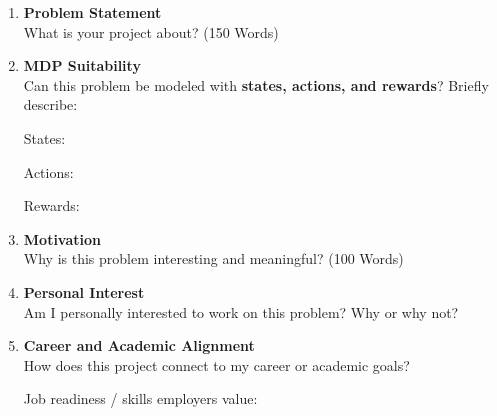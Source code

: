 \documentclass[12pt,a4paper]{article}
\begin{document}
\begin{enumerate}
    \item \textbf{Problem Statement} \\[3pt]
    What is your project about? (150 Words) 
    \begin{tcolorbox}[height=8cm]
    \end{tcolorbox}
\clearpage
    \item \textbf{MDP Suitability} \\[3pt]
    Can this problem be modeled with \textbf{states, actions, and rewards}? Briefly describe:  
    \begin{tcolorbox}[height=7cm]

    \vspace{1em}
    
    States: \\
    
    \vspace{1em}
    
    Actions: \\

    \vspace{1em}
    
    Rewards:
    \end{tcolorbox}

    \item \textbf{Motivation} \\[3pt]
    Why is this problem interesting and meaningful? (100 Words) 
    \begin{tcolorbox}[height=7cm]
    \end{tcolorbox}

    \item \textbf{Personal Interest} \\[3pt]
    Am I personally interested to work on this problem? Why or why not?  
    \begin{tcolorbox}[height=4cm]
    \end{tcolorbox}
    
\clearpage
    \item \textbf{Career and Academic Alignment} \\[3pt]
    How does this project connect to my career or academic goals?  
    \begin{tcolorbox}[height=5cm]
\vspace{1em}
    
    Job readiness / skills employers value: \\

    \vspace{2em}
    

\end{tcolorbox}
\end{enumerate}
\end{document}
